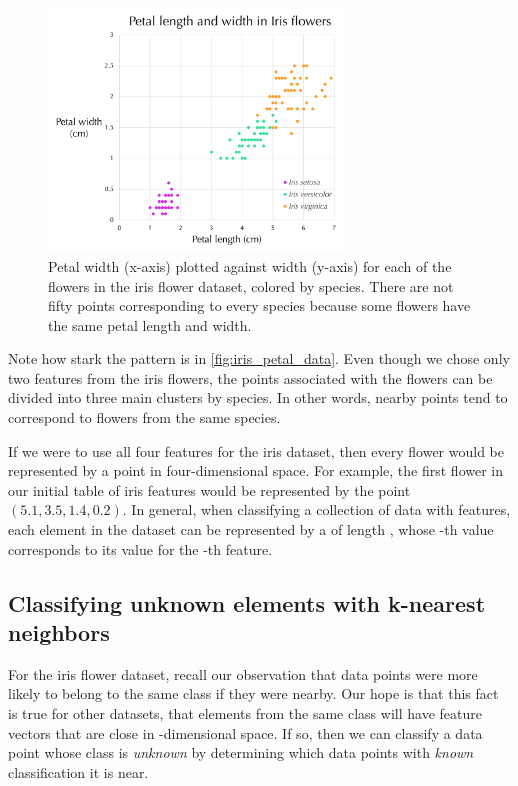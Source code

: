 \begin{figure}[h]
\centering
\mySfFamily
\includegraphics[width = 0.7\textwidth]{../images/iris_petal_data.png}
\caption{Petal width (x-axis) plotted against width (y-axis) for each of the flowers in the iris flower dataset, colored by species. There are not fifty points corresponding to every species because some flowers have the same petal length and width.}
\label{fig:iris_petal_data}
\end{figure}

Note how stark the pattern is in \autoref{fig:iris_petal_data}. Even though we chose only two features from the iris flowers, the points associated with the flowers can be divided into three main clusters by species. In other words, nearby points tend to correspond to flowers from the same species.

If we were to use all four features for the iris dataset, then every flower would be represented by a point in four-dimensional space. For example, the first flower in our initial table of iris features would be represented by the point $(5.1, 3.5, 1.4, 0.2)$. In general, when classifying a collection of data with  features, each element in the dataset can be represented by a  of length , whose -th value corresponds to its value for the -th feature.

\FloatBarrier
{}
\subsection{Classifying unknown elements with k-nearest neighbors}

For the iris flower dataset, recall our observation that data points were more likely to belong to the same class if they were nearby. Our hope is that this fact is true for other datasets, that elements from the same class will have feature vectors that are close in -dimensional space. If so, then we can classify a data point whose class is \textit{unknown} by determining which data points with \textit{known} classification it is near.\\

